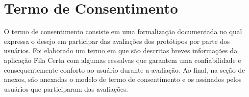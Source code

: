 \chapter[Termo de Consentimento]{Termo de Consentimento}
\label{chap:termoConsentimento}
	
	O termo de consentimento consiste em uma formalização documentada no qual expressa o desejo em participar das avaliações dos protótipos por parte dos usuários. Foi elaborado um termo em que são descritas breves informações da aplicação Fila Certa com algumas ressalvas que garantem uma confiabilidade e consequentemente conforto ao usuário durante a avaliação. Ao final, na seção de anexos, são anexadas o modelo de termo de consentimento e os assinados pelos usuários que participaram das avaliações. 

	

